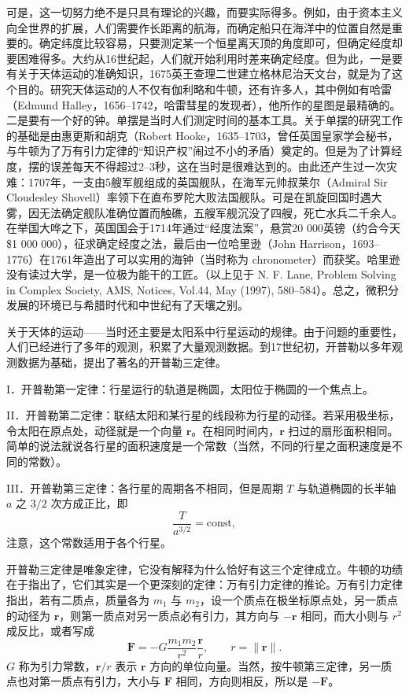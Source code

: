 可是，这一切努力绝不是只具有理论的兴趣，而要实际得多。例如，由于资本主义向全世界的扩展，人们需要作长距离的航海，而确定船只在海洋中的位置自然是重要的。确定纬度比较容易，只要测定某一个恒星离天顶的角度即可，但确定经度却要困难得多。大约从16世纪起，人们就开始利用时差来确定经度。但为此，一是要有关于天体运动的准确知识，1675英王查理二世建立格林尼治天文台，就是为了这个目的。研究天体运动的人不仅有伽利略和牛顿，还有许多人，其中例如有哈雷（Edmund Halley，1656--1742，哈雷彗星的发现者），他所作的星图是最精确的。二是要有一个好的钟。单摆是当时人们测定时间的基本工具。关于单摆的研究工作的基础是由惠更斯和胡克（Robert Hooke，1635--1703，曾任英国皇家学会秘书，与牛顿为了万有引力定律的“知识产权”闹过不小的矛盾）奠定的。但是为了计算经度，摆的误差每天不得超过2--3秒，这在当时是很难达到的。由此还产生过一次灾难：1707年，一支由5艘军舰组成的英国舰队，在海军元帅叔莱尔（Admiral Sir Cloudesley Shovell）率领下在直布罗陀大败法国舰队。可是在凯旋回国时遇大雾，因无法确定舰队准确位置而触礁，五艘军舰沉没了四艘，死亡水兵二千余人。在举国大哗之下，英国国会于1714年通过“经度法案”，悬赏20 000英镑（约合今天\$1 000 000），征求确定经度之法，最后由一位哈里逊（John Harrison，1693--1776）在1761年造出了可以实用的海钟（当时称为 chronometer）而获奖。哈里逊没有读过大学，是一位极为能干的工匠。（以上见于 N. F. Lane, Problem Solving in Complex Society, AMS, Notices, Vol.44, May (1997), 580--584）。总之，微积分发展的环境已与希腊时代和中世纪有了天壤之别。

关于天体的运动——当时还主要是太阳系中行星运动的规律。由于问题的重要性，人们已经进行了多年的观测，积累了大量观测数据。到17世纪初，开普勒以多年观测数据为基础，提出了著名的开普勒三定律。

\noindent I．开普勒第一定律：行星运行的轨道是椭圆，太阳位于椭圆的一个焦点上。

\noindent II．开普勒第二定律：联结太阳和某行星的线段称为行星的动径。若采用极坐标，令太阳在原点处，动径就是一个向量 $\boldsymbol r$。在相同时间内，$\boldsymbol r$ 扫过的扇形面积相同。简单的说法就说各行星的面积速度是一个常数（当然，不同的行星之面积速度是不同的常数）。

\noindent III．开普勒第三定律：各行星的周期各不相同，但是周期 $T$ 与轨道椭圆的长半轴 $a$ 之 $3/2$ 次方成正比，即
\[
\frac{T}{a^{3/2}}=\mathrm{const},
\]
注意，这个常数适用于各个行星。

开普勒三定律是唯象定律，它没有解释为什么恰好有这三个定律成立。牛顿的功绩在于指出了，它们其实是一个更深刻的定律：万有引力定律的推论。万有引力定律指出，若有二质点，质量各为 $m_1$ 与 $m_2$，设一个质点在极坐标原点处，另一质点的动径为 $\boldsymbol r$，则第一质点对另一质点必有引力，其方向与 $-\boldsymbol r$ 相同，而大小则与 $r^2$ 成反比，或者写成
\[
\boldsymbol F=-G\frac{m_1m_2}{r^2}\frac{\boldsymbol r}{r},\qquad r=\lVert\boldsymbol r\rVert.
\]
$G$ 称为引力常数，$\boldsymbol r/r$ 表示 $\boldsymbol r$ 方向的单位向量。当然，按牛顿第三定律，另一质点也对第一质点有引力，大小与 $\boldsymbol F$ 相同，方向则相反，所以是 $-\boldsymbol F$。

